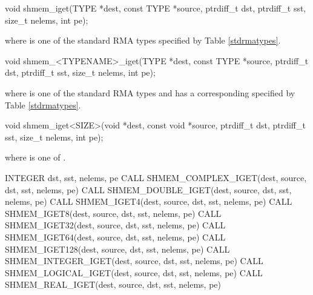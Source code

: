 
\begin{apidefinition}

\begin{C11synopsis}
void shmem_iget(TYPE *dest, const TYPE *source, ptrdiff_t dst, ptrdiff_t sst, size_t nelems, int pe);
\end{C11synopsis}
where \TYPE{} is one of the standard \ac{RMA} types specified by Table \ref{stdrmatypes}.

\begin{Csynopsis}
void shmem_<TYPENAME>_iget(TYPE *dest, const TYPE *source, ptrdiff_t dst, ptrdiff_t sst, size_t nelems, int pe);
\end{Csynopsis}
where \TYPE{} is one of the standard \ac{RMA} types and has a corresponding \TYPENAME{} specified by Table \ref{stdrmatypes}.

\begin{CsynopsisCol}
void shmem_iget<SIZE>(void *dest, const void *source, ptrdiff_t dst, ptrdiff_t sst, size_t  nelems, int pe);
\end{CsynopsisCol}
where \SIZE{} is one of .

\begin{DeprecateBlock}
\begin{Fsynopsis}
INTEGER dst, sst, nelems, pe
CALL SHMEM_COMPLEX_IGET(dest, source, dst, sst, nelems, pe)
CALL SHMEM_DOUBLE_IGET(dest, source, dst, sst, nelems, pe)
CALL SHMEM_IGET4(dest, source, dst, sst, nelems, pe)
CALL SHMEM_IGET8(dest, source, dst, sst, nelems, pe)
CALL SHMEM_IGET32(dest, source, dst, sst, nelems, pe)
CALL SHMEM_IGET64(dest, source, dst, sst, nelems, pe)
CALL SHMEM_IGET128(dest, source, dst, sst, nelems, pe)
CALL SHMEM_INTEGER_IGET(dest, source, dst, sst, nelems, pe)
CALL SHMEM_LOGICAL_IGET(dest, source, dst, sst, nelems, pe)
CALL SHMEM_REAL_IGET(dest, source, dst, sst, nelems, pe)
\end{Fsynopsis}
\end{DeprecateBlock}


\end{apidefinition}
